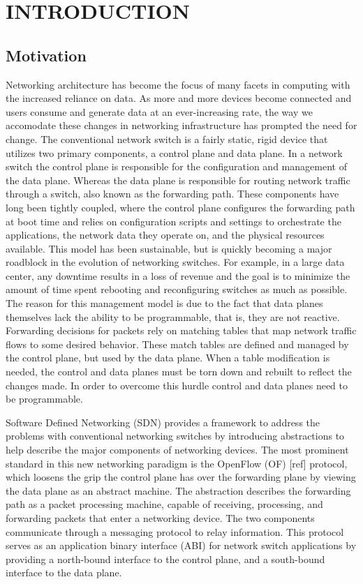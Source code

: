 \chapter{INTRODUCTION}
\label{intro}

\section{Motivation}

Networking architecture has become the focus of many facets in computing
with the increased reliance on data. As more and more devices become connected
and users consume and generate data at an ever-increasing rate, the way we
accomodate these changes in networking infrastructure has prompted the need
for change. The conventional network switch is a fairly static, rigid device
that utilizes two primary components, a control plane and data plane. In a
network switch the control plane is responsible for the configuration and
management of the data plane. Whereas the data plane is responsible for routing
network traffic through a switch, also known as the forwarding path. These
components have long been tightly coupled, where the control plane configures 
the forwarding path at boot time and relies on configuration scripts and
settings to orchestrate the applications, the network data they operate on, 
and the physical resources available. This model has been sustainable, but is 
quickly becoming a major roadblock in the evolution of networking switches. 
For example, in a large data center, any downtime results in a loss of revenue 
and the goal is to minimize the amount of time spent rebooting and
reconfiguring switches as much as possible. The reason for this management
model is due to the fact that data planes themselves lack the ability to be
programmable, that is, they are not reactive. Forwarding decisions for packets
rely on matching tables that map network traffic flows to some desired 
behavior. These match tables are defined and managed by the control plane, but
used by the data plane. When a table modification is needed, the control and
data planes must be torn down and rebuilt to reflect the changes made. In
order to overcome this hurdle control and data planes need to be programmable.

Software Defined Networking (SDN) provides a framework to address the
problems with conventional networking switches by introducing abstractions
to help describe the major components of networking devices. The most prominent
standard in this new networking paradigm is the OpenFlow (OF) [ref] protocol,
which loosens the grip the control plane has over the forwarding plane by 
viewing the data plane as an abstract machine. The abstraction describes the 
forwarding path as a packet processing machine, capable of receiving,
processing, and forwarding packets that enter a networking device. The two 
components communicate through a messaging protocol to relay information. This
protocol serves as an application binary interface (ABI) for network switch 
applications by providing a north-bound interface to the control plane, and a 
south-bound interface to the data plane.

